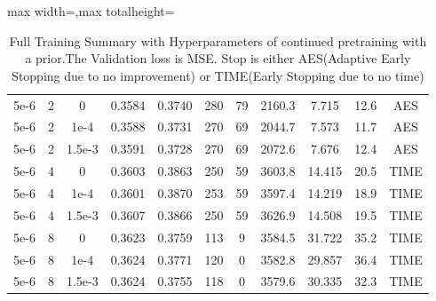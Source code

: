 \begin{table}[p]
\begin{adjustbox}{max width=\textwidth,max totalheight=\textheight}
\begin{tabular}{ccccccccccc}
5e-6&2&0&0.3584&0.3740&280&79&2160.3&7.715&12.6&AES\\
5e-6&2&1e-4&0.3588&0.3731&270&69&2044.7&7.573&11.7&AES\\
5e-6&2&1.5e-3&0.3591&0.3728&270&69&2072.6&7.676&12.4&AES\\
5e-6&4&0&0.3603&0.3863&250&59&3603.8&14.415&20.5&TIME\\
5e-6&4&1e-4&0.3601&0.3870&253&59&3597.4&14.219&18.9&TIME\\
5e-6&4&1.5e-3&0.3607&0.3866&250&59&3626.9&14.508&19.5&TIME\\
5e-6&8&0&0.3623&0.3759&113&9&3584.5&31.722&35.2&TIME\\
5e-6&8&1e-4&0.3624&0.3771&120&0&3582.8&29.857&36.4&TIME\\
5e-6&8&1.5e-3&0.3624&0.3755&118&0&3579.6&30.335&32.3&TIME\\
\hline
\end{tabular}
\end{adjustbox}
\caption{Full Training Summary with Hyperparameters of continued pretraining with a prior.The Validation loss is MSE. Stop is either AES(Adaptive Early Stopping due to no improvement) or TIME(Early Stopping due to no time)}
\end{table}


